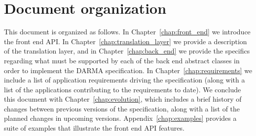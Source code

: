 






\section{Document organization}
\label{sec:organization}
This document is organized as follows.  In Chapter~\ref{chap:front_end} we
introduce the \gls{front end} \gls{API}.  In
Chapter~\ref{chap:translation_layer} we
provide a description of the \gls{translation layer}, and in
Chapter~\ref{chap:back_end} we provide the specifics regarding what must be
supported by each of the \gls{back end} abstract classes in order to implement
the \gls{DARMA} specification. In Chapter~\ref{chap:requirements} we include a list
of application requirements driving the specification (along with a list of the
    applications contributing to the requirements to date).
We conclude this document with
Chapter~\ref{chap:evolution}, which includes a brief history of changes between
previous versions of the specification, along with a list of the planned changes 
in upcoming versions.
Appendix~\ref{chap:examples} provides a suite of examples that illustrate the
 \gls{front end} \gls{API} features. 


